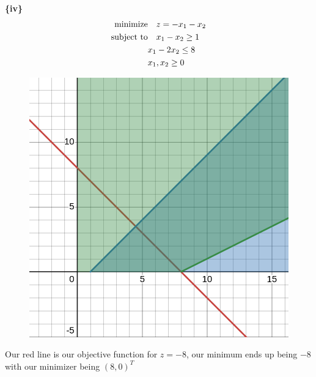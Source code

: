 \documentclass{article}
\begin{document}
\textbf{\{iv\}}
    \begin{align*}
        \text{minimize} &\null \quad z = -x_1 - x_2 \\ 
        \text{subject to} &\null \quad x_1 - x_2 \geq 1 \\
        & x_1 - 2x_2 \leq 8 \\
        & x_1, x_2 \geq 0
    \end{align*}
    \begin{figure}[H]
        \centering
        \includegraphics[scale = 0.35]{1.1(iv).png}
    \end{figure}

Our red line is our objective function for $z = -8$, our minimum ends up being $-8$ with our minimizer being $(8,0)^T$
\end{document}
